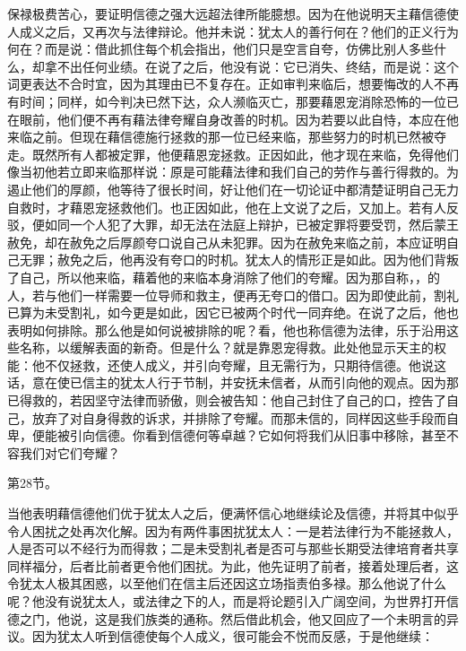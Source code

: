 保禄极费苦心，要证明信德之强大远超法律所能臆想。因为在他说明天主藉信德使人成义之后，又再次与法律辩论。他并未说：犹太人的善行何在？他们的正义行为何在？而是说：借此抓住每个机会指出，他们只是空言自夸，仿佛比别人多些什么，却拿不出任何业绩。在说了之后，他没有说：它已消失、终结，而是说：这个词更表达不合时宜，因为其理由已不复存在。正如审判来临后，想要悔改的人不再有时间；同样，如今判决已然下达，众人濒临灭亡，那要藉恩宠消除恐怖的一位已在眼前，他们便不再有藉法律夸耀自身改善的时机。因为若要以此自恃，本应在他来临之前。但现在藉信德施行拯救的那一位已经来临，那些努力的时机已然被夺走。既然所有人都被定罪，他便藉恩宠拯救。正因如此，他才现在来临，免得他们像当初他若立即来临那样说：原是可能藉法律和我们自己的劳作与善行得救的。为遏止他们的厚颜，他等待了很长时间，好让他们在一切论证中都清楚证明自己无力自救时，才藉恩宠拯救他们。也正因如此，他在上文说了之后，又加上。若有人反驳，便如同一个人犯了大罪，却无法在法庭上辩护，已被定罪将要受罚，然后蒙王赦免，却在赦免之后厚颜夸口说自己从未犯罪。因为在赦免来临之前，本应证明自己无罪；赦免之后，他再没有夸口的时机。犹太人的情形正是如此。因为他们背叛了自己，所以他来临，藉着他的来临本身消除了他们的夸耀。因为那自称，，的人，若与他们一样需要一位导师和救主，便再无夸口的借口。因为即使此前，割礼已算为未受割礼，如今更是如此，因它已被两个时代一同弃绝。在说了之后，他也表明如何排除。那么他是如何说被排除的呢？看，他也称信德为法律，乐于沿用这些名称，以缓解表面的新奇。但是什么？就是靠恩宠得救。此处他显示天主的权能：他不仅拯救，还使人成义，并引向夸耀，且无需行为，只期待信德。他说这话，意在使已信主的犹太人行于节制，并安抚未信者，从而引向他的观点。因为那已得救的，若因坚守法律而骄傲，则会被告知：他自己封住了自己的口，控告了自己，放弃了对自身得救的诉求，并排除了夸耀。而那未信的，同样因这些手段而自卑，便能被引向信德。你看到信德何等卓越？它如何将我们从旧事中移除，甚至不容我们对它们夸耀？\par

第28节。\par

当他表明藉信德他们优于犹太人之后，便满怀信心地继续论及信德，并将其中似乎令人困扰之处再次化解。因为有两件事困扰犹太人：一是若法律行为不能拯救人，人是否可以不经行为而得救；二是未受割礼者是否可与那些长期受法律培育者共享同样福分，后者比前者更令他们困扰。为此，他先证明了前者，接着处理后者，这令犹太人极其困惑，以至他们在信主后还因这立场指责伯多禄。那么他说了什么呢？他没有说犹太人，或法律之下的人，而是将论题引入广阔空间，为世界打开信德之门，他说，这是我们族类的通称。然后借此机会，他又回应了一个未明言的异议。因为犹太人听到信德使每个人成义，很可能会不悦而反感，于是他继续：\par


